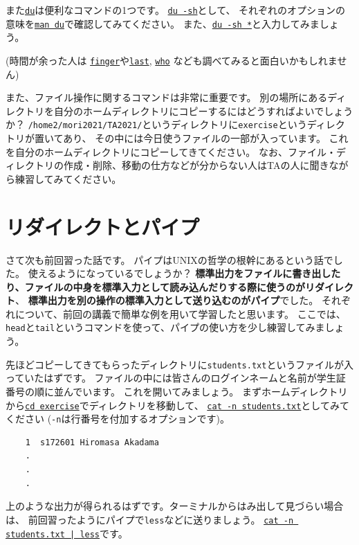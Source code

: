 \documentclass[a4j]{ltjsreport}
\begin{document}
    また\underline{\texttt{du}}は便利なコマンドの1つです。
    \underline{\texttt{du -sh}}として、
    それぞれのオプションの意味を\underline{\texttt{man du}}で確認してみてください。
    また、\underline{\texttt{du -sh *}}と入力してみましょう。

    (時間が余った人は \underline{\texttt{finger}}や\underline{\texttt{last}}, 
    \underline{\texttt{who}} なども調べてみると面白いかもしれません)

    また、ファイル操作に関するコマンドは非常に重要です。
    別の場所にあるディレクトリを自分のホームディレクトリにコピーするにはどうすればよいでしょうか？
    \verb+/home2/mori2021/TA2021/+というディレクトリに\verb+exercise+というディレクトリが置いてあり、
    その中には今日使うファイルの一部が入っています。
    これを自分のホームディレクトリにコピーしてきてください。
    なお、ファイル・ディレクトリの作成・削除、移動の仕方などが分からない人はTAの人に聞きながら練習してみてください。



    \section{リダイレクトとパイプ}
    さて次も前回習った話です。
    パイプはUNIXの哲学の根幹にあるという話でした。
    使えるようになっているでしょうか？
    \textbf{標準出力をファイルに書き出したり、ファイルの中身を標準入力として読み込んだりする際に使うのがリダイレクト}、
    \textbf{標準出力を別の操作の標準入力として送り込むのがパイプ}でした。
    それぞれについて、前回の講義で簡単な例を用いて学習したと思います。
    ここでは、\verb+head+と\verb+tail+というコマンドを使って、パイプの使い方を少し練習してみましょう。

    \vspace*{3mm}
    先ほどコピーしてきてもらったディレクトリに\verb+students.txt+というファイルが入っていたはずです。
    ファイルの中には皆さんのログインネームと名前が学生証番号の順に並んでいます。
    これを開いてみましょう。
    まずホームディレクトリから\underline{\texttt{cd exercise}}でディレクトリを移動して、
    \underline{\texttt{cat -n students.txt}}としてみてください
    (\verb+-n+は行番号を付加するオプションです)。
    \begin{verbatim}                               
    1  s172601 Hiromasa Akadama
    .                                                
    .
    .
    \end{verbatim}

    上のような出力が得られるはずです。ターミナルからはみ出して見づらい場合は、
    前回習ったようにパイプで\verb+less+などに送りましょう。
    \underline{\texttt{cat -n students.txt | less}}です。
\end{document}
